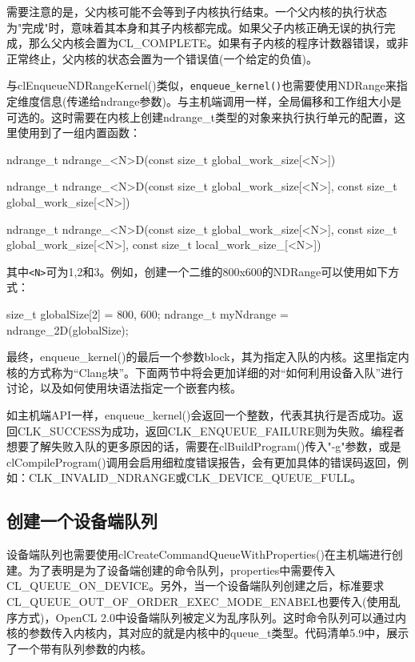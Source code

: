 需要注意的是，父内核可能不会等到子内核执行结束。一个父内核的执行状态为"完成"时，意味着其本身和其子内核都完成。如果父子内核正确无误的执行完成，那么父内核会置为CL\_\allowbreak{}COMPLETE。如果有子内核的程序计数器错误，或非正常终止，父内核的状态会置为一个错误值(一个给定的负值)。

与clEnqueueNDRangeKernel()类似，\texttt{enqueue\_kernel()}也需要使用NDRange来指定维度信息(传递给ndrange参数)。与主机端调用一样，全局偏移和工作组大小是可选的。这时需要在内核上创建ndrange\_\allowbreak{}t类型的对象来执行执行单元的配置，这里使用到了一组内置函数：

\begin{codebox}[cpp]
ndrange_t ndrange_<N>D(const size_t global_work_size[<N>])

ndrange_t ndrange_<N>D(const size_t global_work_size[<N>], const size_t global_work_size[<N>])

ndrange_t ndrange_<N>D(const size_t global_work_size[<N>], const size_t global_work_size[<N>], const size_t local_work_size_[<N>])
\end{codebox}

其中\texttt{\textless{}N\textgreater{}}可为1,2和3。例如，创建一个二维的800x600的NDRange可以使用如下方式：

\begin{codebox}[cpp]
size_t globalSize[2] = {800, 600};
ndrange_t myNdrange = ndrange_2D(globalSize);
\end{codebox}

最终，enqueue\_\allowbreak{}kernel()的最后一个参数block，其为指定入队的内核。这里指定内核的方式称为“Clang块”。下面两节中将会更加详细的对“如何利用设备入队”进行讨论，以及如何使用块语法指定一个嵌套内核。

如主机端API一样，enqueue\_\allowbreak{}kernel()会返回一个整数，代表其执行是否成功。返回CLK\_\allowbreak{}SUCCESS为成功，返回CLK\_\allowbreak{}ENQUEUE\_\allowbreak{}FAILURE则为失败。编程者想要了解失败入队的更多原因的话，需要在clBuildProgram()传入"-g"参数，或是clCompileProgram()调用会启用细粒度错误报告，会有更加具体的错误码返回，例如：CLK\_\allowbreak{}INVALID\_\allowbreak{}NDRANGE或CLK\_\allowbreak{}DEVICE\_\allowbreak{}QUEUE\_\allowbreak{}FULL。

\subsection{创建一个设备端队列}

设备端队列也需要使用clCreateCommandQueueWithProperties()在主机端进行创建。为了表明是为了设备端创建的命令队列，properties中需要传入CL\_\allowbreak{}QUEUE\_\allowbreak{}ON\_\allowbreak{}DEVICE。另外，当一个设备端队列创建之后，标准要求CL\_\allowbreak{}QUEUE\_\allowbreak{}OUT\_\allowbreak{}OF\_\allowbreak{}ORDER\_\allowbreak{}EXEC\_\allowbreak{}MODE\_\allowbreak{}ENABEL也要传入(使用乱序方式)，OpenCL 2.0中设备端队列被定义为乱序队列。这时命令队列可以通过内核的参数传入内核内，其对应的就是内核中的queue\_\allowbreak{}t类型。代码清单5.9中，展示了一个带有队列参数的内核。

